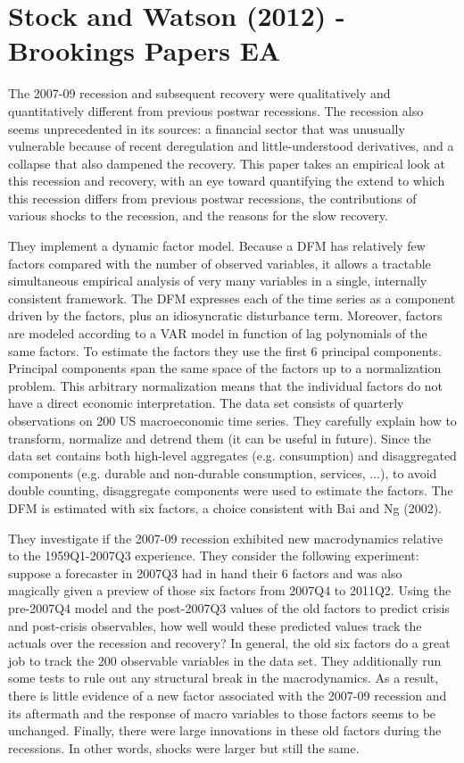 \documentclass{article}
\begin{document}
{\section{Stock and Watson (2012) - Brookings Papers EA}

The 2007-09 recession and subsequent recovery were qualitatively and quantitatively different from previous postwar recessions. The recession also seems unprecedented in its sources: a financial sector that was unusually vulnerable because of recent deregulation and little-understood derivatives, and a collapse that also dampened the recovery. This paper takes an empirical look at this recession and recovery, with an eye toward quantifying the extend to which this recession differs from previous postwar recessions, the contributions of various shocks to the recession, and the reasons for the slow recovery.

They implement a dynamic factor model. Because a DFM has relatively few factors compared with the number of observed variables, it allows a tractable simultaneous empirical analysis of very many variables in a single, internally consistent framework. The DFM expresses each of the time series as a component driven by the factors, plus an idiosyncratic disturbance term. Moreover, factors are modeled according to a VAR model in function of lag polynomials of the same factors. To estimate the factors they use the first 6 principal components. Principal components span the same space of the factors up to a normalization problem. This arbitrary normalization means that the individual factors do not have a direct economic interpretation. The data set consists of quarterly observations on 200 US macroeconomic time series. They carefully explain how to transform, normalize and detrend them (it can be useful in future). Since the data set contains both high-level aggregates (e.g. consumption) and disaggregated components (e.g. durable and non-durable consumption, services, ...), to avoid double counting, disaggregate components were used to estimate the factors. The DFM is estimated with six factors, a choice consistent with Bai and Ng (2002).

They investigate if the 2007-09 recession exhibited new macrodynamics relative to the 1959Q1-2007Q3 experience. They consider the following experiment: suppose a forecaster in 2007Q3 had in hand their 6 factors and was also magically given a preview of those six factors from 2007Q4 to 2011Q2. Using the pre-2007Q4 model and the post-2007Q3 values of the old factors to predict crisis and post-crisis observables, how well would these predicted values track the actuals over the recession and recovery? In general, the old six factors do a great job to track the 200 observable variables in the data set. They additionally run some tests to rule out any structural break in the macrodynamics. As a result, there is little evidence of a new factor associated with the 2007-09 recession and its aftermath and the response of macro variables to those factors seems to be unchanged. Finally, there were large innovations in these old factors during the recessions. In other words, shocks were larger but still the same. 

}
\end{document}
